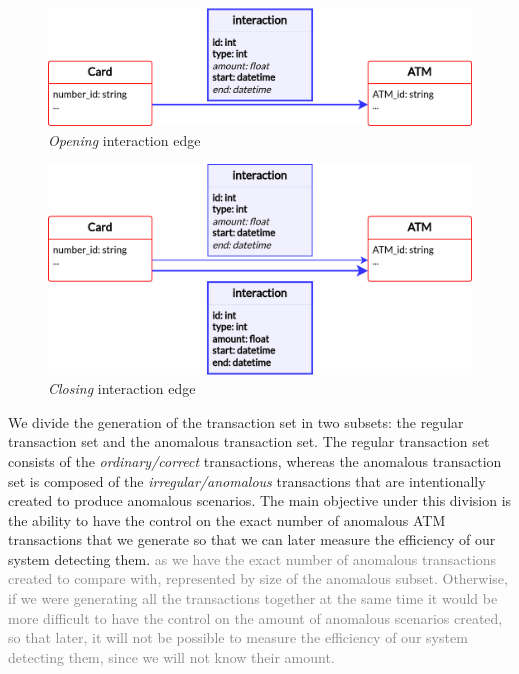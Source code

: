 \documentclass{article}
\begin{document}
\begin{figure}[h]
  \centering
  \includegraphics[scale = 0.8]{images/2-edges-tx-tfm.png}
  \caption{\emph{Opening} interaction edge}
  \label{img:opening-edge}
\end{figure}

\begin{figure}[h]
  \centering
  \includegraphics[scale = 0.8]{images/2-edges-tx-tfm-1.png}
  \caption{\emph{Closing} interaction edge}
  \label{img:closing-edge}
\end{figure}

We divide the generation of the transaction set in two subsets: the regular transaction set and the anomalous transaction set. The regular transaction set consists of the \emph{ordinary/correct} transactions, whereas the anomalous transaction set is composed of the \emph{irregular/anomalous} transactions that are intentionally created to produce anomalous scenarios.
The main objective under this division is the ability to have the control on the exact number of anomalous ATM transactions that we generate so that we can later measure the efficiency of our system detecting them. \textcolor{gray}{as we have the exact number of anomalous transactions created to compare with, represented by size of the anomalous subset. Otherwise, if we were generating all the transactions together at the same time it would be more difficult to have the control on the amount of anomalous scenarios created, so that later, it will not be possible to measure the efficiency of our system detecting them, since we will not know their amount.}
\end{document}
